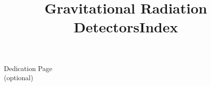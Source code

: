 \documentclass{ws-book975x65}
\title{Gravitational Radiation Detectors}              %
\begin{document}
\titlepages                        %

\begin{dedication}
\large Dedication Page \\[13pt]    %
\large (optional)
\end{dedication}

\blankpage                         %




\tableofcontents



\setcounter{page}{1}


%


%

%



%


% 

\blankpage                         %
\title{Index}                      %
\printindex
\end{document}
